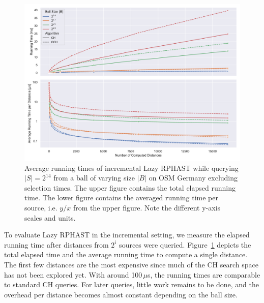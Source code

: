\documentclass[manuscript,review]{acmart}
\begin{document}
\begin{figure}
\centering
\includegraphics[width=\linewidth]{fig/lazy_rphast_inc.pdf}
\caption{
Average running times of incremental Lazy RPHAST while querying $|S| = 2^{14}$ from a ball of varying size $|B|$ on OSM Germany excluding selection times.
The upper figure contains the total elapsed running time.
The lower figure contains the averaged running time per source, i.e. $y/x$ from the upper figure.
Note the different y-axis scales and units.
}\label{fig:lazy_rphast_inc}
\end{figure}

To evaluate Lazy RPHAST in the incremental setting, we measure the elapsed running time after distances from $2^i$ sources were queried.
Figure~\ref{fig:lazy_rphast_inc} depicts the total elapsed time and the average running time to compute a single distance.
The first few distances are the most expensive since much of the CH search space has not been explored yet.
With around 100\,$\mu$s, the running times are comparable to standard CH queries.
For later queries, little work remains to be done, and the overhead per distance becomes almost constant depending on the ball size.
\end{document}
